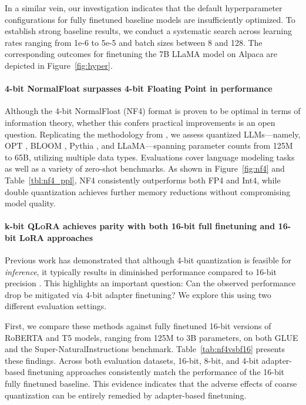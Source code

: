 In a similar vein, our investigation indicates that the default hyperparameter configurations for fully finetuned baseline models are insufficiently optimized. To establish strong baseline results, we conduct a systematic search across learning rates ranging from 1e-6 to 5e-5 and batch sizes between 8 and 128. The corresponding outcomes for finetuning the 7B LLaMA model on Alpaca are depicted in Figure~\ref{fig:hyper}.

\paragraph{4-bit NormalFloat surpasses 4-bit Floating Point in performance}

Although the 4-bit NormalFloat (NF4) format is proven to be optimal in terms of information theory, whether this confers practical improvements is an open question. Replicating the methodology from \citet{dettmers2022case}, we assess quantized LLMs—namely, OPT \citep{zhang2022opt}, BLOOM \cite{scao2022bloom}, Pythia \cite{biderman2023pythia}, and LLaMA—spanning parameter counts from 125M to 65B, utilizing multiple data types. Evaluations cover language modeling tasks as well as a variety of zero-shot benchmarks. As shown in Figure~\ref{fig:nf4} and Table~\ref{tbl:nf4_ppl}, NF4 consistently outperforms both FP4 and Int4, while double quantization achieves further memory reductions without compromising model quality.

\paragraph{k-bit \textsc{QLoRA} achieves parity with both 16-bit full finetuning and 16-bit LoRA approaches} 

Previous work has demonstrated that although 4-bit quantization is feasible for \emph{inference}, it typically results in diminished performance compared to 16-bit precision \citep{dettmers2022case,frantar2022gptq}. This highlights an important question: Can the observed performance drop be mitigated via 4-bit adapter finetuning? We explore this using two different evaluation settings.

First, we compare these methods against fully finetuned 16-bit versions of RoBERTA and T5 models, ranging from 125M to 3B parameters, on both GLUE and the Super-NaturalInstructions benchmark. Table~\ref{tab:nf4vsbf16} presents these findings. Across both evaluation datasets, 16-bit, 8-bit, and 4-bit adapter-based finetuning approaches consistently match the performance of the 16-bit fully finetuned baseline. This evidence indicates that the adverse effects of coarse quantization can be entirely remedied by adapter-based finetuning.

